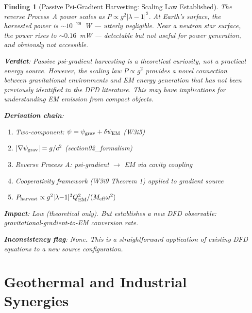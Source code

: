 \documentclass[11pt]{article}
\newtheorem{finding}{Finding}
\newcommand{\psigrav}{\psi_{\rm grav}}
\newcommand{\dpsiEM}{\delta\psi_{\rm EM}}
\newcommand{\Meff}{M_{\rm eff}}
\newcommand{\lambdaone}{|\lambda{-}1|}
\newcommand{\QEM}{Q_{\rm EM}}
\begin{document}
\begin{finding}[Passive Psi-Gradient Harvesting: Scaling Law Established]
\label{find:psi-harvest}
The reverse Process~A power scales as $P \propto g^2 \lambdaone^2$. At
Earth's surface, the harvested power is $\sim 10^{-29}$~W --- utterly
negligible. Near a neutron star surface, the power rises to $\sim 0.16$~mW
--- detectable but not useful for power generation, and obviously not
accessible.

\textbf{Verdict}: Passive psi-gradient harvesting is a \emph{theoretical
curiosity}, not a practical energy source. However, the scaling law
$P \propto g^2$ provides a novel connection between gravitational
environments and EM energy generation that has not been previously
identified in the DFD literature. This may have implications for
understanding EM emission from compact objects.

\textbf{Derivation chain}:
\begin{enumerate}[nosep]
\item Two-component: $\psi = \psigrav + \dpsiEM$ (W3i5)
\item $|\nabla\psigrav| = g/c^2$ (section02\_formalism)
\item Reverse Process A: psi-gradient $\to$ EM via cavity coupling
\item Cooperativity framework (W3i9 Theorem 1) applied to gradient source
\item $P_{\rm harvest} \propto g^2 \lambdaone^2 \QEM^2 / (\Meff \omega^2)$
\end{enumerate}

\textbf{Impact}: Low (theoretical only). But establishes a new DFD
observable: gravitational-gradient-to-EM conversion rate.

\textbf{Inconsistency flag}: None. This is a straightforward application
of existing DFD equations to a new source configuration.
\end{finding}

\part{Geothermal and Industrial Synergies}
\label{part:geothermal}

\end{document}
